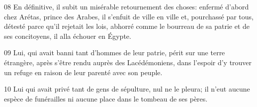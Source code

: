 
08 En définitive, il subit un misérable retournement des choses: enfermé d’abord chez Arétas, prince des Arabes, il s’enfuit de ville en ville et, pourchassé par tous, détesté parce qu’il rejetait les lois, abhorré comme le bourreau de sa patrie et de ses concitoyens, il alla échouer en Égypte.

09 Lui, qui avait banni tant d’hommes de leur patrie, périt sur une terre étrangère, après s’être rendu auprès des Lacédémoniens, dans l’espoir d’y trouver un refuge en raison de leur parenté avec son peuple.

10 Lui qui avait privé tant de gens de sépulture, nul ne le pleura; il n’eut aucune espèce de funérailles ni aucune place dans le tombeau de ses pères.